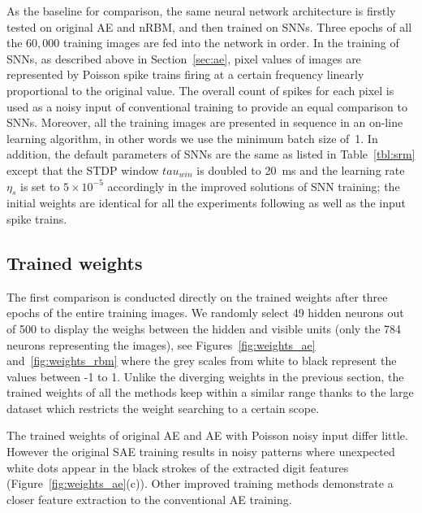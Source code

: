 As the baseline for comparison, the same neural network architecture is firstly tested on original AE and nRBM, and then trained on SNNs.
Three epochs of all the $60,000$ training images are fed into the network in order.
In the training of SNNs, as described above in Section~\ref{sec:ae}, pixel values of images are represented by Poisson spike trains firing at a certain frequency linearly proportional to the original value.
The overall count of spikes for each pixel is used as a noisy input of conventional training to provide an equal comparison to SNNs.
Moreover, all the training images are presented in sequence in an on-line learning algorithm, in other words we use the minimum batch size of~1.
In addition, the default parameters of SNNs are the same as listed in Table~\ref{tbl:srm} except that the STDP window $tau_{win}$ is doubled to 20~ms and the learning rate $\eta_s$ is set to $5 \times 10^{-5}$ accordingly in the improved solutions of SNN training;
the initial weights are identical for all the experiments following as well as the input spike trains.


\subsection{Trained weights}
The first comparison is conducted directly on the trained weights after three epochs of the entire training images.
We randomly select 49 hidden neurons out of 500 to display the weighs between the hidden and visible units (only the 784 neurons representing the images), see Figures~\ref{fig:weights_ae} and~\ref{fig:weights_rbm} where the grey scales from white to black represent the values between -1 to 1.
Unlike the diverging weights in the previous section, the trained weights of all the methods keep within a similar range thanks to the large dataset which restricts the weight searching to a certain scope.  

The trained weights of original AE and AE with Poisson noisy input differ little.
However the original SAE training results in noisy patterns where unexpected white dots appear in the black strokes of the extracted digit features (Figure~\ref{fig:weights_ae}(c)).
Other improved training methods demonstrate a closer feature extraction to the conventional AE training.

